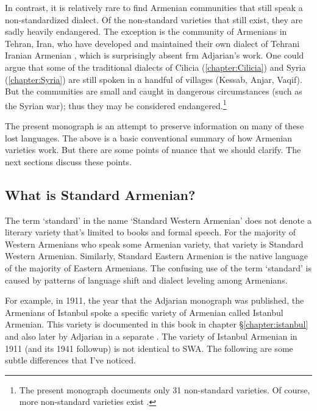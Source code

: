 In contrast, it is relatively rare to find Armenian communities that still speak a non-standardized dialect. Of the non-standard varieties that still exist, they are sadly heavily endangered. The exception is the community of Armenians in Tehran, Iran, who have developed and maintained their own dialect of Tehrani Iranian Armenian \citep{DolatianEtAl-prep-IranianGrammar}, which is surprisingly absent frm Adjarian's work. One could argue that some of the traditional dialects of Cilicia (\ref{chapter:Cilicia}) and Syria (\ref{chapter:Syria}) are still spoken in a handful of villages (Kessab, Anjar, Vaqif). But the communities are small and caught in dangerous circumstances (such as the Syrian war); thus they may be considered endangered.\footnote{The present monograph documents only 31 non-standard varieties. Of course, more non-standard varieties exist \citep{GreppinKhachaturian-1986-HandbookArmenianDialectology,Martirosyan-2019-Armeniandialects,Martirosyan-2019-ArmenianDialectsBigVersionRussianJournal}.} 

 The present monograph is an attempt to preserve information on many of these lost languages. The above is a basic conventional summary of how Armenian varieties work. But there are some points of nuance that we should clarify. The next sections discuss these points. 

 

\subsection{What is Standard Armenian?}\label{sec:HossepIntro:armenian:whatisstandard}
The term `standard' in the name `Standard Western Armenian' does not denote a literary variety that's limited to books and formal speech. For the majority of Western Armenians who speak some Armenian variety, that variety is Standard Western Armenian. Similarly, Standard Eastern Armenian is the native language of the majority of Eastern Armenians. The confusing use of the term `standard' is caused by patterns of language shift and dialect leveling among Armenians.

For example, in 1911, the year that the Adjarian monograph was published, the Armenians of Istanbul spoke a specific variety of Armenian called Istanbul Armenian. This variety is documented in this book in chapter \S\ref{chapter:istanbul} and also later by Adjarian in a separate \citep{Adjarian-1941-IstanbulDialect}. The variety of Istanbul Armenian in 1911 (and its 1941 followup) is not identical to SWA. The following are some subtle differences that I've noticed. 

